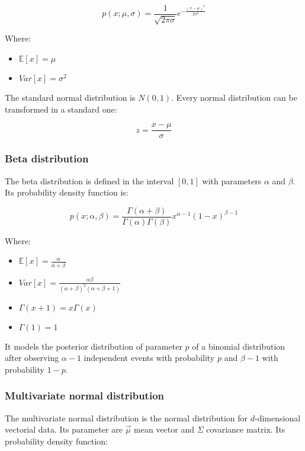 		$$p(x;\mu,\sigma) = \frac{1}{\sqrt{2\pi\sigma}}e^{-\frac{(x-\mu)^2}{2\sigma^2}}$$

		Where:

		\begin{multicols}{2}
			\begin{itemize}
				\item $\mathbb{E}[x] = \mu$
				\item $Var[x] = \sigma^2$
			\end{itemize}
		\end{multicols}

		The standard normal distribution is $N(0,1)$.
		Every normal distribution can be transformed in a standard one:

		$$z = \frac{x-\mu}{\sigma}$$

		\subsubsection{Beta distribution}
		The beta distribution is defined in the interval $[0,1]$ with parameters $\alpha$ and $\beta$.
		Its probability density function is:

		$$p(x;\alpha, \beta) = \frac{\Gamma(\alpha + \beta)}{\Gamma(\alpha)\Gamma(\beta)}x^{\alpha-1}(1-x)^{\beta-1}$$

		Where:

		\begin{multicols}{2}
			\begin{itemize}
				\item $\mathbb{E}[x] = \frac{\alpha}{\alpha+\beta}$
				\item $Var[x] = \frac{\alpha\beta}{(\alpha+\beta)^2(\alpha+\beta+1)}$
				\item $\Gamma(x+1) = x\Gamma(x)$
				\item $\Gamma(1) = 1$
			\end{itemize}
		\end{multicols}

		It models the posterior distribution of parameter $p$ of a binomial distribution after observing $\alpha-1$ independent events with probability $p$ and $\beta-1$ with probability $1-p$.

		\subsubsection{Multivariate normal distribution}
		The multivariate normal distribution is the normal distribution for $d$-dimensional vectorial data.
		Its parameter are $\vec{\mu}$ mean vector and $\Sigma$ covariance matrix.
		Its probability density function:


